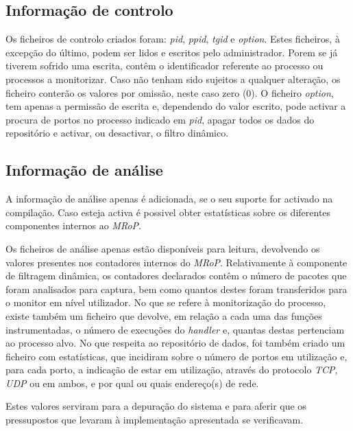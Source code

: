 \subsection{Informação de controlo}

Os ficheiros de controlo criados foram: \textit{pid}, \textit{ppid}, \textit{tgid} e \textit{option}.
Estes ficheiros, à excepção do último, podem ser lidos e escritos pelo administrador.
Porem se já tiverem sofrido uma escrita, contêm o identificador referente ao processo ou processos a monitorizar.
Caso não tenham sido sujeitos a qualquer alteração, os ficheiro conterão os valores por omissão, neste caso zero (0).
O ficheiro \textit{option}, tem apenas a permissão de escrita e, dependendo do valor escrito, pode activar a procura de portos no processo indicado em \textit{pid}, apagar todos os dados do repositório e activar, ou desactivar, o filtro dinâmico.

\subsection{Informação de análise}
A informação de análise apenas é adicionada, se o seu suporte for activado na compilação.
Caso esteja activa é possivel obter estatísticas sobre os diferentes componentes internos ao \textit{MRoP}.

Os ficheiros de análise apenas estão disponíveis para leitura, devolvendo os valores presentes nos contadores internos do \textit{MRoP}.
Relativamente à componente de filtragem dinâmica, os contadores declarados contêm o número de pacotes que foram analisados para captura, bem como quantos destes foram transferidos para o monitor em nível utilizador.
No que se refere à monitorização do processo, existe também um ficheiro que devolve, em relação a cada uma das funções instrumentadas, o número de execuções do \textit{handler} e, quantas destas pertenciam ao processo alvo.
No que respeita ao repositório de dados, foi também criado um ficheiro com estatísticas, que incidiram sobre o número de portos em utilização e, para cada porto, a indicação de estar em utilização, através do protocolo \textit{TCP}, \textit{UDP} ou em ambos, e por qual ou quais endereço(s) de rede.

Estes valores serviram para a depuração do sistema e para aferir que os pressupostos que levaram à implementação apresentada se verificavam.



